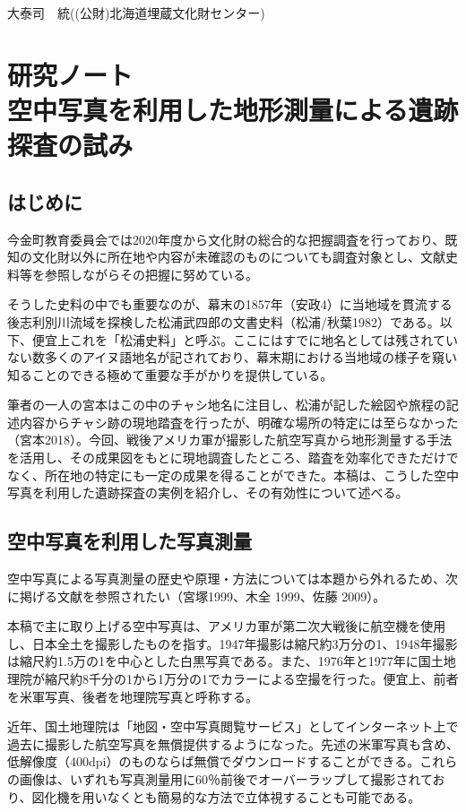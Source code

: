 \documentclass[a4j,11pt,twocolumn,openany]{jsbook}
\begin{document}
\begin{flushright}
	大泰司　統((公財)北海道埋蔵文化財センター)
\end{flushright}


\chapter{研究ノート\\空中写真を利用した地形測量による遺跡探査の試み}

\section{はじめに}
今金町教育委員会では2020年度から文化財の総合的な把握調査を行っており、既知の文化財以外に所在地や内容が未確認のものについても調査対象とし、文献史料等を参照しながらその把握に努めている。

そうした史料の中でも重要なのが、幕末の1857年（安政4）に当地域を貫流する後志利別川流域を探検した松浦武四郎の文書史料（松浦/秋葉1982）である。以下、便宜上これを「松浦史料」と呼ぶ。ここにはすでに地名としては残されていない数多くのアイヌ語地名が記されており、幕末期における当地域の様子を窺い知ることのできる極めて重要な手がかりを提供している。

筆者の一人の宮本はこの中のチャシ地名に注目し、松浦が記した絵図や旅程の記述内容からチャシ跡の現地踏査を行ったが、明確な場所の特定には至らなかった（宮本2018）。今回、戦後アメリカ軍が撮影した航空写真から地形測量する手法を活用し、その成果図をもとに現地調査したところ、踏査を効率化できただけでなく、所在地の特定にも一定の成果を得ることができた。本稿は、こうした空中写真を利用した遺跡探査の実例を紹介し、その有効性について述べる。

\section{空中写真を利用した写真測量}

空中写真による写真測量の歴史や原理・方法については本題から外れるため、次に掲げる文献を参照されたい（宮塚1999、木全 1999、佐藤 2009）。

本稿で主に取り上げる空中写真は、アメリカ軍が第二次大戦後に航空機を使用し、日本全土を撮影したものを指す。1947年撮影は縮尺約3万分の1、1948年撮影は縮尺約1.5万の1を中心とした白黒写真である。また、1976年と1977年に国土地理院が縮尺約8千分の1から1万分の1でカラーによる空撮を行った。便宜上、前者を米軍写真、後者を地理院写真と呼称する。

近年、国土地理院は「地図・空中写真閲覧サービス」としてインターネット上で過去に撮影した航空写真を無償提供するようになった。先述の米軍写真も含め、低解像度（400dpi）のものならば無償でダウンロードすることができる。これらの画像は、いずれも写真測量用に60％前後でオーバーラップして撮影されており、図化機を用いなくとも簡易的な方法で立体視することも可能である。
\end{document}
